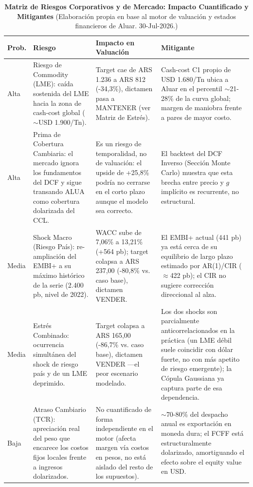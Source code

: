\documentclass[10pt,a4paper]{article}
\begin{document}
\begin{table}[H]
\centering
\caption{\textbf{Matriz de Riesgos Corporativos y de Mercado: Impacto Cuantificado y Mitigantes} {\small\color{gsgray} (Elaboración propia en base al motor de valuación y estados financieros de Aluar. 30-Jul-2026.)}}
\tiny
\begin{tabular}{p{1.1cm}p{3.3cm}p{4.7cm}p{4.7cm}}
\toprule
\textbf{Prob.} & \textbf{Riesgo} & \textbf{Impacto en Valuación} & \textbf{Mitigante} \\
\midrule
Alta & Riesgo de Commodity (LME): caída sostenida del LME hacia la zona de cash-cost global ($\sim$USD 1.900/Tn). & Target cae de ARS 1.236 a ARS 812 (-34,3\%), dictamen pasa a MANTENER (ver Matriz de Estrés). & Cash-cost C1 propio de USD 1.680/Tn ubica a Aluar en el percentil $\sim$21-28\% de la curva global; margen de maniobra frente a pares de mayor costo. \\
Alta & Prima de Cobertura Cambiaria: el mercado ignora los fundamentos del DCF y sigue transando ALUA como cobertura dolarizada del CCL. & Es un riesgo de temporalidad, no de valuación: el upside de +25,8\% podría no cerrarse en el corto plazo aunque el modelo sea correcto. & El backtest del DCF Inverso (Sección Monte Carlo) muestra que esta brecha entre precio y $g$ implícito es recurrente, no estructural. \\
Media & Shock Macro (Riesgo País): re-ampliación del EMBI+ a su máximo histórico de la serie (2.400 pb, nivel de 2022). & WACC sube de 7,06\% a 13,21\% (+564 pb); target colapsa a ARS 237,00 (-80,8\% vs. caso base), dictamen VENDER. & El EMBI+ actual (441 pb) ya está cerca de su equilibrio de largo plazo estimado por AR(1)/CIR ($\approx$422 pb); el CIR no sugiere corrección direccional al alza. \\
Media & Estrés Combinado: ocurrencia simultánea del shock de riesgo país y de un LME deprimido. & Target colapsa a ARS 165,00 (-86,7\% vs. caso base), dictamen VENDER —el peor escenario modelado. & Los dos shocks son parcialmente anticorrelacionados en la práctica (un LME débil suele coincidir con dólar fuerte, no con más apetito de riesgo emergente); la Cópula Gaussiana ya captura parte de esa dependencia. \\
Baja & Atraso Cambiario (TCR): apreciación real del peso que encarece los costos fijos locales frente a ingresos dolarizados. & No cuantificado de forma independiente en el motor (afecta margen vía costos en pesos, no está aislado del resto de los supuestos). & $\sim$70-80\% del despacho anual es exportación en moneda dura; el FCFF está estructuralmente dolarizado, amortiguando el efecto sobre el equity value en USD. \\

\end{tabular}
\end{table}
\end{document}
